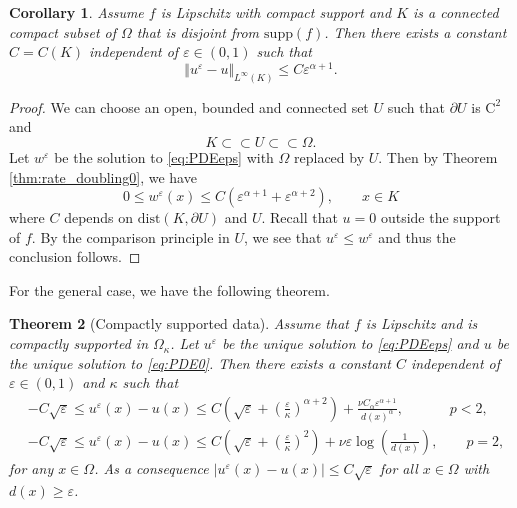 \documentclass[12pt,reqno]{amsart}
\numberwithin{figure}{section}
\theoremstyle{plain}
\newtheorem{thm}{Theorem}[section]
\newtheorem{cor}[thm]{Corollary}
\theoremstyle{remark}
\numberwithin{equation}{section}
\newcommand{\rmC}{\mathrm{C}}
\begin{document}
\begin{cor} Assume $f$ is Lipschitz with compact support and $K$ is a connected compact subset of $\Omega$ that is disjoint from $\mathrm{supp}(f)$. Then there exists a constant $C = C(K)$ independent of $\varepsilon\in (0,1)$ such that 
\begin{equation*}
     \Vert u^\varepsilon - u\Vert_{L^\infty(K)} \leq C\varepsilon^{\alpha+1}.
\end{equation*}
\end{cor}
\begin{proof} We can choose an open, bounded and connected set $U$ such that $\partial U$ is $\rmC^2$ and 
\begin{equation*}
    K\subset\subset U \subset\subset \Omega.    
\end{equation*}
Let $w^\varepsilon$ be the solution to \eqref{eq:PDEeps} with $\Omega$ replaced by $U$. Then by Theorem \ref{thm:rate_doubling0}, we have
\begin{equation*}
    0\leq w^\varepsilon(x)\leq C\left(\varepsilon^{\alpha+1} + \varepsilon^{\alpha+2}\right), \qquad x\in K
\end{equation*}
where $C$ depends on $\mathrm{dist}(K, \partial U)$ and $U$. Recall that $u = 0$ outside the support of $f$. By the comparison principle in $U$, we see that $u^\varepsilon \leq w^\varepsilon$ and thus the conclusion follows.
\end{proof}



For the general case, we have the following theorem.


\begin{thm}[Compactly supported data]\label{thm:rate_doubling1} Assume that $f$ is Lipschitz and is compactly supported in $\Omega_{\kappa}$. Let $u^\varepsilon$ be the unique solution to \eqref{eq:PDEeps} and $u$ be the unique solution to \eqref{eq:PDE0}. Then there exists a constant $C$ independent of $\varepsilon\in(0,1)$ and $\kappa$ such that 
\begin{align}
   &-C \sqrt{\varepsilon}\leq  u^\varepsilon(x) - u(x) \leq C\left(\sqrt{\varepsilon}+\left(\frac{\varepsilon}{\kappa}\right)^{\alpha+2}\right) + \frac{\nu C_\alpha  \varepsilon^{\alpha+1}}{d(x)^\alpha}, \quad\; \qquad p<2,\label{eq:cp1}\\
   &-C\sqrt{\varepsilon}\leq u^\varepsilon(x) - u(x) \leq C \left(\sqrt{\varepsilon}+ \left(\frac{\varepsilon}{\kappa}\right)^2\right) +  \nu \varepsilon \log\left(\frac{1}{d(x)}\right), \qquad p=2, \label{eq:cp2}
\end{align}
for any $x\in \Omega$. As a consequence $|u^\varepsilon(x)-u(x)|\leq C\sqrt{\varepsilon}$ for all $x\in \Omega$ with $d(x)\geq \varepsilon$.
\end{thm}
\end{document}
